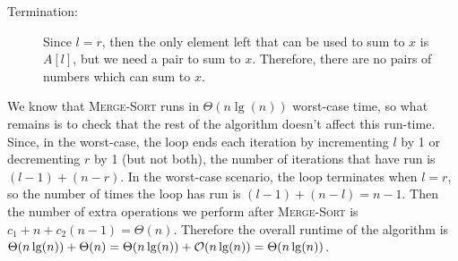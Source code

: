 \documentclass[Chapter02]{subfiles}
\begin{document}
\begin{enumerate}
\begin{answer}
\begin{description}
				\item[Termination:] Since $l = r$, then the only element left that can be used to sum to $x$ is $A[l]$, but we need a pair to sum to $x$. Therefore, there are no pairs of numbers which can sum to $x$.
			\end{description}

			We know that \textsc{Merge-Sort} runs in $\Theta(n \lg(n))$ worst-case time, so what remains is to check that the rest of the algorithm doesn't affect this run-time. Since, in the worst-case, the loop ends each iteration by incrementing $l$ by 1 or decrementing $r$ by 1 (but not both), the number of iterations that have run is $(l - 1) + (n - r)$. In the worst-case scenario, the loop terminates when $l = r$, so the number of times the loop has run is $(l - 1) + (n - l) = n - 1$. Then the number of extra operations we perform after \textsc{Merge-Sort} is $c_1 + n + c_2(n - 1) = \Theta(n)$. Therefore the overall runtime of the algorithm is $\Theta(n\lg(n)) + \Theta(n) = \Theta(n \lg(n)) + \mathcal{O}(n \lg(n)) = \Theta(n \lg(n))$.
		\end{answer}

	\end{enumerate}
\end{document}
